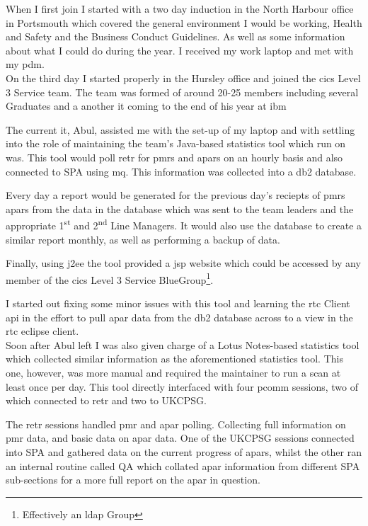 \documentclass[a4paper,11pt]{report}
\begin{document}
When I first join I started with a two day induction in the North Harbour office in Portsmouth 
which covered the general environment I would be working, Health and Safety and the Business 
Conduct Guidelines. As well as some information about what I could do during the year. I received
my work laptop and met with my \gls{pdm}. \\



On the third day I started properly in the Hursley office and joined the \gls{cics} Level 3 Service
team. The team was formed of around 20-25 members including several Graduates and a another 
\gls{it} coming to the end of his year at \gls{ibm}

The current \gls{it}, Abul, assisted me with the set-up of my laptop and with settling into the 
role of maintaining the team's Java-based statistics tool which run on \gls{was}. This tool would 
poll \gls{retr} for \gls{pmr}s and \gls{apar}s on an hourly basis and also connected to SPA using 
\gls{mq}. This information was collected into a \gls{db2} database.

Every day a report would be generated for the previous day's reciepts of \gls{pmr}s \gls{apar}s 
from the data in the database which was sent to the team leaders and the appropriate 
1\textsuperscript{st} and 2\textsuperscript{nd} Line Managers. It would also use the database to
create a similar report monthly, as well as performing a backup of data.

Finally, using \gls{j2ee} the tool provided a \gls{jsp} website which could be accessed by any 
member of the \gls{cics} Level 3 Service BlueGroup\footnote{Effectively an \gls{ldap} Group}.

I started out fixing some minor issues with this tool and learning the \gls{rtc} Client \gls{api}
in the effort to pull \gls{apar} data from the \gls{db2} database across to a view in the \gls{rtc}
eclipse client. \\



Soon after Abul left I was also given charge of a Lotus Notes-based statistics tool which collected
similar information as the aforementioned statistics tool. This one, however, was more manual and
required the maintainer to run a scan at least once per day. This tool directly interfaced with 
four \gls{pcomm} sessions, two of which connected to \gls{retr} and two to UKCPSG.

The \gls{retr} sessions handled \gls{pmr} and \gls{apar} polling. Collecting full information on
\gls{pmr} data, and basic data on \gls{apar} data. One of the UKCPSG sessions connected into SPA 
and gathered data on the current progress of \gls{apar}s, whilst the other ran an internal routine 
called QA which collated \gls{apar} information from different SPA sub-sections for a more full
report on the \gls{apar} in question. \\
\end{document}
